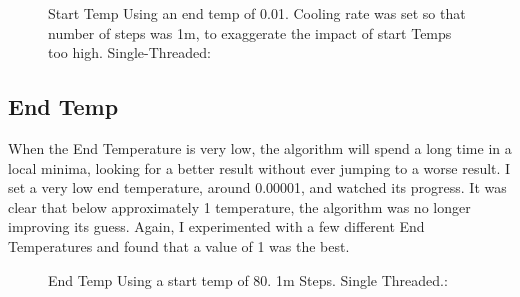 \documentclass[a4paper, 11pt,table]{article}
\begin{document}
	\begin{figure}
		\begin{center}
			Start Temp
			Using an end temp of 0.01. Cooling rate was set so that number of steps was 1m, to exaggerate the impact of start Temps too high. Single-Threaded:
			
		\end{center}
	\end{figure}


\subsection{End Temp}
When the End Temperature is very low, the algorithm will spend a long time in a local minima, looking for a better result without ever jumping to a worse result. I set a very low end temperature, around 0.00001, and watched its progress. It was clear that below approximately 1 temperature, the algorithm was no longer improving its guess. Again, I experimented with a few different End Temperatures and found that a value of 1 was the best.

\begin{figure}
	\begin{center}
		End Temp
		Using a start temp of 80. 1m Steps. Single Threaded.:
		
	\end{center}
\end{figure}
\end{document}
